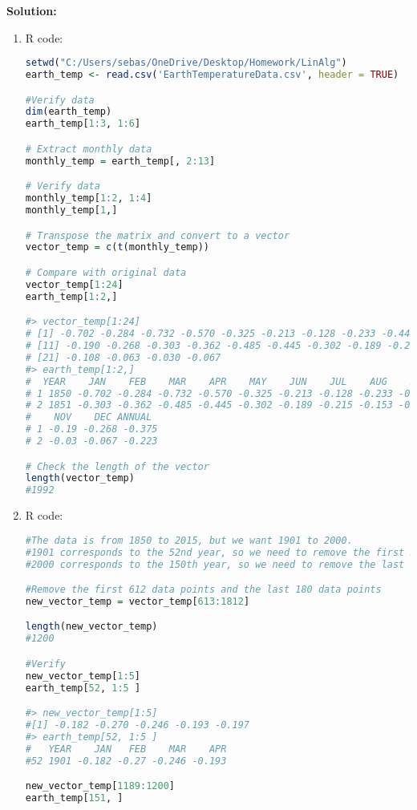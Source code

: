 \documentclass[12pt]{article}
\newenvironment{solution}{
    \textbf{Solution:}
    
}{
    
    \vspace{2em}
}
\begin{document}
\begin{solution}
    \begin{enumerate}[label=\alph*)]
        \item R code:
        \begin{lstlisting}[language=R]
setwd("C:/Users/sebas/OneDrive/Desktop/Homework/LinAlg")
earth_temp <- read.csv('EarthTemperatureData.csv', header = TRUE)

#Verify data
dim(earth_temp)
earth_temp[1:3, 1:6]

# Extract monthly data
monthly_temp = earth_temp[, 2:13]

# Verify data
monthly_temp[1:2, 1:4]
monthly_temp[1,]

# Transpose the matrix and convert to a vector
vector_temp = c(t(monthly_temp))

# Compare with original data
vector_temp[1:24]
earth_temp[1:2,]

#> vector_temp[1:24]
# [1] -0.702 -0.284 -0.732 -0.570 -0.325 -0.213 -0.128 -0.233 -0.444 -0.452
# [11] -0.190 -0.268 -0.303 -0.362 -0.485 -0.445 -0.302 -0.189 -0.215 -0.153
# [21] -0.108 -0.063 -0.030 -0.067
#> earth_temp[1:2,]
#  YEAR    JAN    FEB    MAR    APR    MAY    JUN    JUL    AUG    SEP    OCT
# 1 1850 -0.702 -0.284 -0.732 -0.570 -0.325 -0.213 -0.128 -0.233 -0.444 -0.452
# 2 1851 -0.303 -0.362 -0.485 -0.445 -0.302 -0.189 -0.215 -0.153 -0.108 -0.063
#    NOV    DEC ANNUAL
# 1 -0.19 -0.268 -0.375
# 2 -0.03 -0.067 -0.223

# Check the length of the vector
length(vector_temp)
#1992
        \end{lstlisting}
        \item R code:
        \begin{lstlisting}[language=R]
#The data is from 1850 to 2015, but we want 1901 to 2000.
#1901 corresponds to the 52nd year, so we need to remove the first 51 years or 612 data points.
#2000 corresponds to the 150th year, so we need to remove the last 15 years or 180 data points.

#Remove the first 612 data points and the last 180 data points
new_vector_temp = vector_temp[613:1812]

length(new_vector_temp)
#1200

#Verify
new_vector_temp[1:5]
earth_temp[52, 1:5 ]

#> new_vector_temp[1:5]
#[1] -0.182 -0.270 -0.246 -0.193 -0.197
#> earth_temp[52, 1:5 ]
#   YEAR    JAN   FEB    MAR    APR
#52 1901 -0.182 -0.27 -0.246 -0.193

new_vector_temp[1189:1200]
earth_temp[151, ]


\end{lstlisting}
\end{enumerate}
\end{solution}
\end{document}
